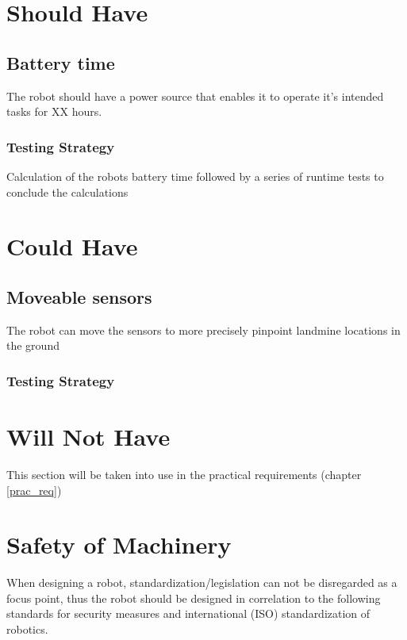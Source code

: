 
\section{Should Have}

\subsection{Battery time}\label{R12}
The robot should have a power source that enables it to operate it's intended tasks for XX hours.

\subsubsection*{Testing Strategy}
Calculation of the robots battery time followed by a series of runtime tests to conclude the calculations


\section{Could Have}

\subsection{Moveable sensors}\label{R13}
The robot can move the sensors to more precisely pinpoint landmine locations in the ground

\subsubsection*{Testing Strategy}

\section{Will Not Have}

This section will be taken into use in the practical requirements (chapter \ref{prac_req})


\newpage


\section{Safety of Machinery}
When designing a robot, standardization/legislation can not be disregarded as a focus point, thus the robot should be designed in correlation to the following standards for security measures and international (ISO) standardization of robotics.

